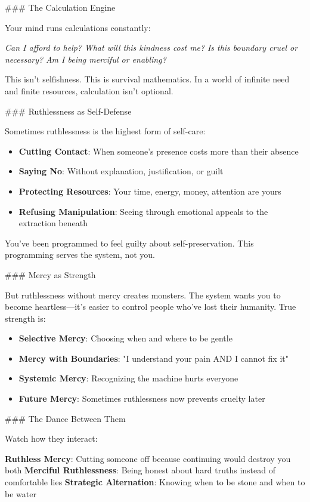 \documentclass[12pt]{book}
\begin{document}
\#\#\# The Calculation Engine

Your mind runs calculations constantly:

\textit{Can I afford to help?}
\textit{What will this kindness cost me?}
\textit{Is this boundary cruel or necessary?}
\textit{Am I being merciful or enabling?}

This isn't selfishness. This is survival mathematics. In a world of infinite need and finite resources, calculation isn't optional.

\#\#\# Ruthlessness as Self-Defense

Sometimes ruthlessness is the highest form of self-care:

\begin{itemize}
\item \textbf{Cutting Contact}: When someone's presence costs more than their absence
\item \textbf{Saying No}: Without explanation, justification, or guilt
\item \textbf{Protecting Resources}: Your time, energy, money, attention are yours
\item \textbf{Refusing Manipulation}: Seeing through emotional appeals to the extraction beneath

\end{itemize}
You've been programmed to feel guilty about self-preservation. This programming serves the system, not you.

\#\#\# Mercy as Strength

But ruthlessness without mercy creates monsters. The system wants you to become heartless—it's easier to control people who've lost their humanity. True strength is:

\begin{itemize}
\item \textbf{Selective Mercy}: Choosing when and where to be gentle
\item \textbf{Mercy with Boundaries}: "I understand your pain AND I cannot fix it"
\item \textbf{Systemic Mercy}: Recognizing the machine hurts everyone
\item \textbf{Future Mercy}: Sometimes ruthlessness now prevents cruelty later

\end{itemize}
\#\#\# The Dance Between Them

Watch how they interact:

\textbf{Ruthless Mercy}: Cutting someone off because continuing would destroy you both
\textbf{Merciful Ruthlessness}: Being honest about hard truths instead of comfortable lies
\textbf{Strategic Alternation}: Knowing when to be stone and when to be water
\end{document}
